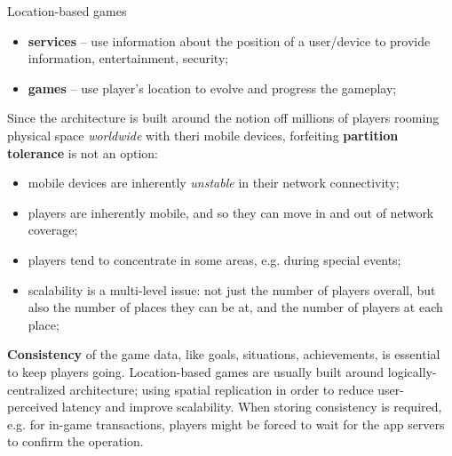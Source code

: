 \documentclass[11pt, a4paper]{article}
\begin{document}
\begin{example}{Location-based games}{}
    \begin{itemize}
        \item \textbf{services} -- use information about the position of a user/device to provide information, entertainment, security;
        \item \textbf{games} -- use player's location to evolve and progress the gameplay;
    \end{itemize}
    Since the architecture is built around the notion off millions of players rooming physical space \textit{worldwide} with theri mobile devices, forfeiting \textbf{partition tolerance} is not an option:
    \begin{itemize}
        \item mobile devices are inherently \textit{unstable} in their network connectivity;
        \item players are inherently mobile, and so they can move in and out of network coverage;
        \item players tend to concentrate in some areas, e.g. during special events;
        \item scalability is a multi-level issue: not just the number of players overall, but also the number of places they can be at, and the number of players at each place;
    \end{itemize}
\textbf{Consistency} of the game data, like goals, situations, achievements, is essential to keep players going.
Location-based games are usually built around logically-centralized architecture; using spatial replication in order to reduce user-perceived latency and improve scalability.
When storing consistency is required, e.g. for in-game transactions, players might be forced to wait for the app servers to confirm the operation.
\end{example}
%
\end{document}
